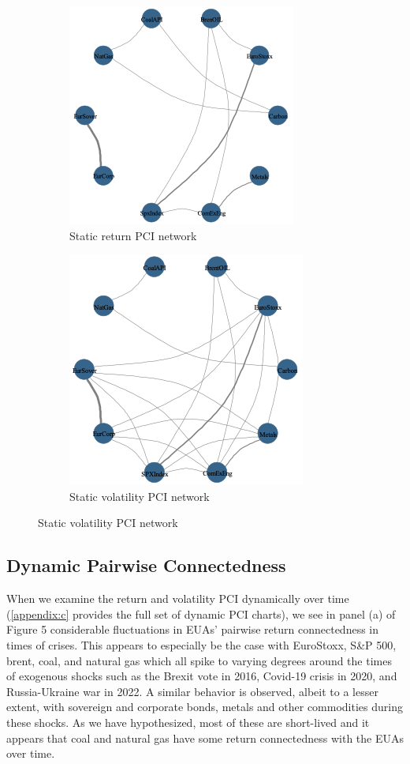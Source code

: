 \documentclass[preprint, 3p,
authoryear]{elsarticle} %
\begin{document}
\begin{figure}[H]
  \caption{Network representation of Pairwise Connectedness Index (PCI) (Jan 2013 – August 2024)}
  \label{fig:statPCI}
      \begin{subfigure}[b]{\textwidth}
        \centering
        \caption{Static return PCI network}
        \label{fig:statretPCI}
        \includegraphics[width = 0.45\linewidth]{../figures/4a-StatRetPCI}
      \end{subfigure}
      \begin{subfigure}[b]{\textwidth}
        \centering
        \bigskip
        \caption{Static volatility PCI network}
        \label{fig:statvolPCI}
        \includegraphics[width = 0.45\linewidth]{../figures/4b-StatVolPCI}
      \end{subfigure}
\end{figure}

\hypertarget{dynamic-pairwise-connectedness}{%
\subsection{Dynamic Pairwise
Connectedness}\label{dynamic-pairwise-connectedness}}

When we examine the return and volatility PCI dynamically over time
(\ref{appendix:c} provides the full set of dynamic PCI charts), we see
in panel (a) of Figure 5 considerable fluctuations in EUAs' pairwise
return connectedness in times of crises. This appears to especially be
the case with EuroStoxx, S\&P 500, brent, coal, and natural gas which
all spike to varying degrees around the times of exogenous shocks such
as the Brexit vote in 2016, Covid-19 crisis in 2020, and Russia-Ukraine
war in 2022. A similar behavior is observed, albeit to a lesser extent,
with sovereign and corporate bonds, metals and other commodities during
these shocks. As we have hypothesized, most of these are short-lived and
it appears that coal and natural gas have some return connectedness with
the EUAs over time.
\end{document}

